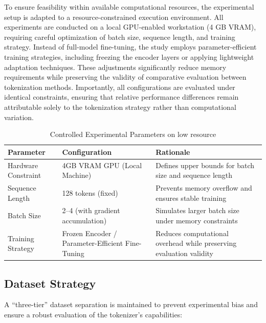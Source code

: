 \documentclass[12pt]{article}
\begin{document}
To ensure feasibility within available computational resources, the experimental setup is adapted to a resource-constrained execution environment. All experiments are conducted on a local GPU-enabled workstation (4 GB VRAM), requiring careful optimization of batch size, sequence length, and training strategy. Instead of full-model fine-tuning, the study employs parameter-efficient training strategies, including freezing the encoder layers or applying lightweight adaptation techniques. These adjustments significantly reduce memory requirements while preserving the validity of comparative evaluation between tokenization methods. Importantly, all configurations are evaluated under identical constraints, ensuring that relative performance differences remain attributable solely to the tokenization strategy rather than computational variation.

\begin{table}[H]
\centering
\renewcommand{\arraystretch}{1.3}
\begin{tabularx}{\textwidth}{l X X}
\toprule
\textbf{Parameter} & \textbf{Configuration} & \textbf{Rationale} \\
\midrule

Hardware Constraint & 4GB VRAM GPU (Local Machine) & Defines upper bounds for batch size and sequence length \\ \hline

Sequence Length & 128 tokens (fixed) & Prevents memory overflow and ensures stable training \\ \hline

Batch Size & 2--4 (with gradient accumulation) & Simulates larger batch size under memory constraints \\ \hline

Training Strategy & Frozen Encoder / Parameter-Efficient Fine-Tuning & Reduces computational overhead while preserving evaluation validity \\ \hline

\bottomrule
\end{tabularx}
\caption{Controlled Experimental Parameters on low resource}
\label{tab:parameters}
\end{table}

\subsection{Dataset Strategy}

A ``three-tier'' dataset separation is maintained to prevent experimental bias and ensure a robust evaluation of the tokenizer's capabilities:
\end{document}
